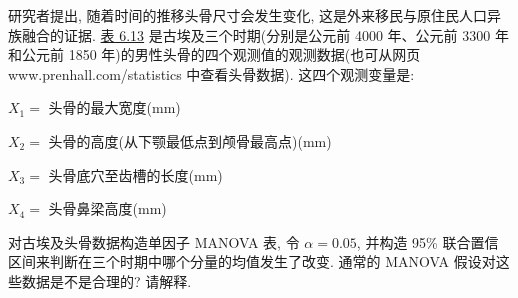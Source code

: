 \quad 研究者提出, 随着时间的推移头骨尺寸会发生变化, 这是外来移民与原住民人口异族融合的证据. \hyperref[tab:6.13]{表 6.13} 是古埃及三个时期(分别是公元前 4000 年、公元前 3300 年和公元前 1850 年)的男性头骨的四个观测值的观测数据(也可从网页 www.prenhall.com/statistics 中查看头骨数据). 这四个观测变量是:

\noindent $X_1=$ 头骨的最大宽度(mm)

\noindent $X_2=$ 头骨的高度(从下颚最低点到颅骨最高点)(mm)

\noindent $X_3=$ 头骨底穴至齿槽的长度(mm)

\noindent $X_4=$ 头骨鼻梁高度(mm)

对古埃及头骨数据构造单因子 MANOVA 表, 令 $\alpha=0.05$, 并构造 95\% 联合置信区间来判断在三个时期中哪个分量的均值发生了改变. 通常的 MANOVA 假设对这些数据是不是合理的? 请解释.
